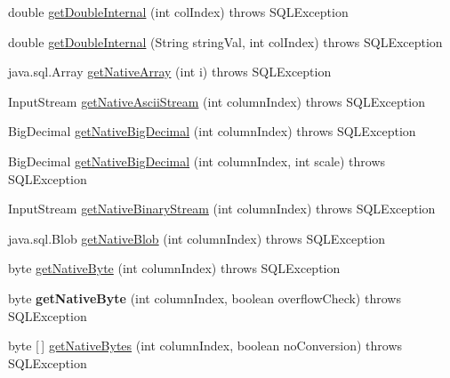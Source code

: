 \begin{DoxyCompactItemize}
\item 
double \mbox{\hyperlink{classcom_1_1mysql_1_1jdbc_1_1_result_set_impl_a23dad19b24da58f74652e22ac3fb4283}{get\+Double\+Internal}} (int col\+Index)  throws S\+Q\+L\+Exception 
\item 
double \mbox{\hyperlink{classcom_1_1mysql_1_1jdbc_1_1_result_set_impl_afc961b03d47113ee8d5b329ec333ad3d}{get\+Double\+Internal}} (String string\+Val, int col\+Index)  throws S\+Q\+L\+Exception 
\item 
java.\+sql.\+Array \mbox{\hyperlink{classcom_1_1mysql_1_1jdbc_1_1_result_set_impl_a76b1a9c9433c919ed45a65c8ace0705f}{get\+Native\+Array}} (int i)  throws S\+Q\+L\+Exception 
\item 
Input\+Stream \mbox{\hyperlink{classcom_1_1mysql_1_1jdbc_1_1_result_set_impl_a25a66bda18485aa6fb3891ba594b8c57}{get\+Native\+Ascii\+Stream}} (int column\+Index)  throws S\+Q\+L\+Exception 
\item 
Big\+Decimal \mbox{\hyperlink{classcom_1_1mysql_1_1jdbc_1_1_result_set_impl_a98fc4a067a058aa2732badb05b9eb4f4}{get\+Native\+Big\+Decimal}} (int column\+Index)  throws S\+Q\+L\+Exception 
\item 
Big\+Decimal \mbox{\hyperlink{classcom_1_1mysql_1_1jdbc_1_1_result_set_impl_a0a7e2392923b5db5870c053d91d42b29}{get\+Native\+Big\+Decimal}} (int column\+Index, int scale)  throws S\+Q\+L\+Exception 
\item 
Input\+Stream \mbox{\hyperlink{classcom_1_1mysql_1_1jdbc_1_1_result_set_impl_adc7bde8fcf56a85896f2d2320ae400be}{get\+Native\+Binary\+Stream}} (int column\+Index)  throws S\+Q\+L\+Exception 
\item 
java.\+sql.\+Blob \mbox{\hyperlink{classcom_1_1mysql_1_1jdbc_1_1_result_set_impl_a3ba3c173658eb8ab87c1f0040cc50fac}{get\+Native\+Blob}} (int column\+Index)  throws S\+Q\+L\+Exception 
\item 
byte \mbox{\hyperlink{classcom_1_1mysql_1_1jdbc_1_1_result_set_impl_a7b543fcc945651d4e6722a3048c22e94}{get\+Native\+Byte}} (int column\+Index)  throws S\+Q\+L\+Exception 
\item 
\mbox{\label{classcom_1_1mysql_1_1jdbc_1_1_result_set_impl_aec119b0510e01c7059a0f5e4a21f376b}} 
byte {\bfseries get\+Native\+Byte} (int column\+Index, boolean overflow\+Check)  throws S\+Q\+L\+Exception 
\item 
byte \mbox{[}$\,$\mbox{]} \mbox{\hyperlink{classcom_1_1mysql_1_1jdbc_1_1_result_set_impl_abd4834b44508518bbd8c292a951772d5}{get\+Native\+Bytes}} (int column\+Index, boolean no\+Conversion)  throws S\+Q\+L\+Exception 

\end{DoxyCompactItemize}
